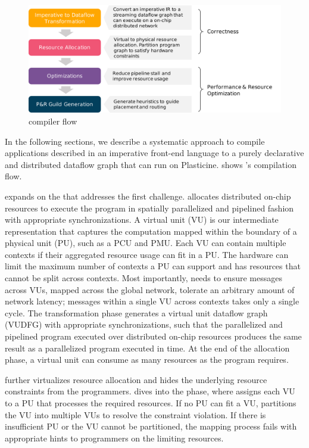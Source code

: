 \begin{figure}
\centering
\includegraphics[width=1\textwidth]{figs/sarastack.pdf}
\caption[\name compiler flow]{\name compiler flow}
\label{fig:flow}
\end{figure}
 
In the following sections, we describe a systematic approach to compile applications described in an
imperative front-end language to a purely declarative and distributed dataflow graph that can
run on Plasticine.  shows \name's compilation flow.

 expands on the  that
addresses the first challenge.
\name allocates distributed on-chip resources to execute the program in spatially parallelized and
pipelined fashion with appropriate synchronizations.
A virtual unit (VU) is our intermediate representation that captures the computation mapped
within the boundary of a physical unit (PU), such as a PCU and PMU.
Each VU can contain multiple contexts if their aggregated resource usage can fit in a PU.
The hardware can limit the maximum number of contexts a PU can support and has resources that cannot be split across contexts.
Most importantly, \name needs to ensure messages across VUs, mapped across the global network,
tolerate an arbitrary amount of network latency; messages within a single VU across contexts takes only a single cycle.
The transformation phase generates a virtual unit dataflow graph (VUDFG) with appropriate
synchronizations, such that the parallelized and pipelined program executed over distributed on-chip resources produces the same result as a
parallelized program executed in time.
At the end of the allocation phase, a virtual unit can consume as many resources as the program
requires. 

\name further virtualizes resource allocation and hides the underlying resource constraints from the programmers.
 dives into the  phase, where \name assigns each VU to a
PU that processes the required resources. If no PU can fit a VU, \name partitions the
VU into multiple VUs to resolve the constraint violation. If there is insufficient PU or the VU
cannot be partitioned, the mapping process fails with appropriate hints to programmers on the limiting resources.

